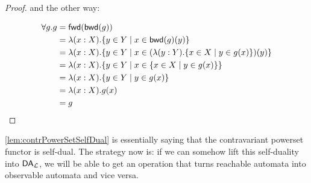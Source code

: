 \begin{proof}
  and the other way:

\begin{align*}
  \forall g . g &= \mathsf{fwd}(\mathsf{bwd}(g)) \\
  & = \lambda (x : X) . \{y \in Y \mid x \in \mathsf{bwd}(g)(y) \} \\
  & = \lambda (x : X) . \{y \in Y \mid x \in (\lambda (y : Y) . \{x \in X \mid y \in g(x) \})(y) \} \\
  & = \lambda (x : X) . \{y \in Y \mid x \in \{x \in X \mid y \in g(x) \} \} \\
  & = \lambda (x : X) . \{y \in Y \mid y \in g(x) \} \\
  & = \lambda (x : X) . g(x) \\
  & = g 
\end{align*}

\end{proof}

\cref{lem:contrPowerSetSelfDual} is essentially saying that the contravariant powerset functor is self-dual.
The strategy now is: if we can somehow lift this self-duality into $\mathsf{DA}_\mathcal L$, we will be able to get an operation that turns reachable automata into observable automata and vice versa.

\newcommand{\Ftwo}{\overline{2}}






